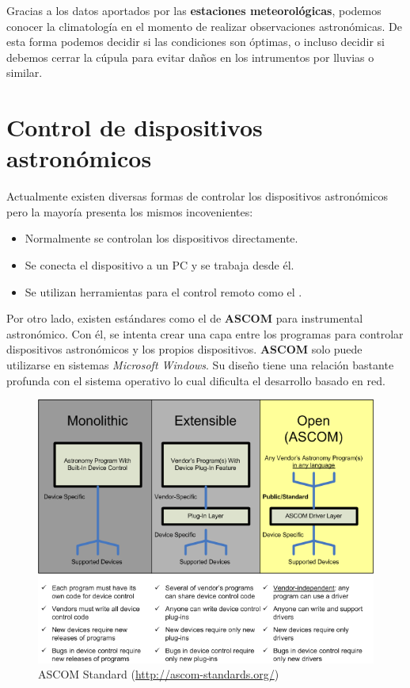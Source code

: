 \bigskip
Gracias a los datos aportados por las \textbf{estaciones meteorológicas}, podemos conocer la climatología en el momento de realizar observaciones astronómicas. De esta forma podemos decidir si las condiciones son óptimas, o incluso decidir si debemos cerrar la cúpula para evitar daños en los intrumentos por lluvias o similar. 

\newpage
\section{Control de dispositivos astronómicos}

Actualmente existen diversas formas de controlar los dispositivos astronómicos pero la mayoría presenta los mismos incovenientes:

\begin{itemize}
  \item Normalmente se controlan los dispositivos directamente.
  \item Se conecta el dispositivo a un PC y se trabaja desde él.
  \item Se utilizan herramientas para el control remoto como el .
\end{itemize}

\bigskip

Por otro lado, existen estándares como el de \textbf{ASCOM} para instrumental astronómico. Con él, se intenta crear una capa entre los programas para controlar dispositivos astronómicos y los propios dispositivos. \textbf{ASCOM} solo puede utilizarse en sistemas \textit{Microsoft Windows}. Su diseño tiene una relación bastante profunda con el sistema operativo lo cual dificulta el desarrollo basado en red.

\bigskip
\begin{figure}[!ht]
  \begin{center}
    \includegraphics[scale=0.5]{../images/ascom.png}
    \caption{ASCOM Standard (\url{http://ascom-standards.org/})}
    \label{fig:ascom}
  \end{center}
\end{figure}


